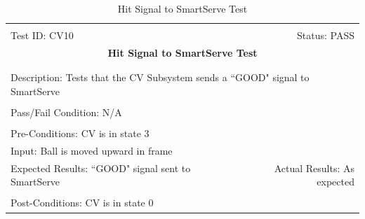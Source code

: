 \documentclass[11pt]{article}
\begin{document}
\begin{center}
\begin{table}[H]
\begin{tabular}{|l r|}\hline&\\[-2mm]
	Test ID: CV10	&Status: PASS\\[-3mm]
	\multicolumn{2}{|c|}{\textbf{\large{Hit Signal to SmartServe Test}}}\\&\\\hline&\\[-3mm]
	\multicolumn{2}{|p{\textwidth}|}{Description: Tests that the CV Subsystem sends a ``GOOD" signal to SmartServe}\\[1mm]\hline&\\[-3mm]
	\multicolumn{2}{|p{\textwidth}|}{Pass/Fail Condition: N/A}\\[1mm]\hline&\\[-3mm]
	\multicolumn{2}{|p{\textwidth}|}{Pre-Conditions: CV is in state 3}\\[4mm]
	\multicolumn{2}{|p{\textwidth}|}{Input: Ball is moved upward in frame}\\[2mm]\hline
	\multicolumn{1}{|p{0.49\textwidth}}{Expected Results: ``GOOD" signal sent to SmartServe}	&\multicolumn{1}{|p{0.45\textwidth}|}{Actual Results: As expected}\\\hline&\\[-3mm]
	\multicolumn{2}{|p{\textwidth}|}{Post-Conditions: CV is in state 0}\\\hline
\end{tabular}
\caption{Hit Signal to SmartServe Test}
\end{table}
\end{center}
\end{document}
